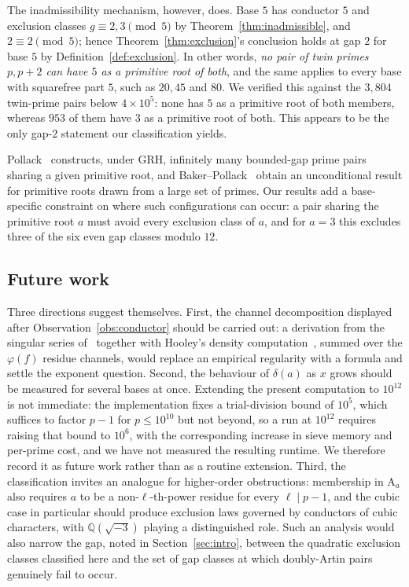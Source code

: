 \documentclass[11pt,reqno]{amsart}
\theoremstyle{plain}
\theoremstyle{definition}
\newcommand{\Art}{\mathrm{A}}
\newcommand{\Q}{\mathbb{Q}}
\begin{document}
The inadmissibility mechanism, however, does. Base $5$ has conductor $5$ and
exclusion classes $g \equiv 2, 3 \pmod 5$ by
Theorem~\ref{thm:inadmissible}, and $2 \equiv 2 \pmod 5$; hence
Theorem~\ref{thm:exclusion}'s conclusion holds at gap $2$ for base $5$ by
Definition~\ref{def:exclusion}. In other words, \emph{no pair of twin primes
$p, p+2$ can have $5$ as a primitive root of both}, and the same applies to
every base with squarefree part $5$, such as $20, 45$ and $80$. We verified
this against the $3{,}804$ twin-prime pairs below $4 \times 10^5$: none has $5$
as a primitive root of both members, whereas $953$ of them have $3$ as a
primitive root of both. This appears to be the only gap-$2$ statement our
classification yields.

Pollack~\cite{Pollack2014} constructs, under GRH, infinitely many bounded-gap
prime pairs sharing a given primitive root, and
Baker--Pollack~\cite{BakerPollack2016} obtain an unconditional result for
primitive roots drawn from a large set of primes. Our results add a
base-specific constraint on where such configurations can occur: a pair
sharing the primitive root $a$ must avoid every exclusion class of $a$, and
for $a = 3$ this excludes three of the six even gap classes modulo $12$.

\subsection*{Future work}
Three directions suggest themselves. First, the channel decomposition displayed
after Observation~\ref{obs:conductor} should be carried out: a derivation from
the singular series of~\cite{HardyLittlewood1923} together with Hooley's
density computation~\cite{Hooley1967}, summed over the $\varphi(f)$ residue
channels, would replace an empirical regularity with a formula and settle the
exponent question. Second, the behaviour of $\delta(a)$ as $x$ grows should be
measured for several bases at once. Extending the present computation to
$10^{12}$ is not immediate: the implementation fixes a trial-division bound of
$10^5$, which suffices to factor $p - 1$ for $p \le 10^{10}$ but not beyond,
so a run at $10^{12}$ requires raising that bound to $10^6$, with the
corresponding increase in sieve memory and per-prime cost, and we have not
measured the resulting runtime. We therefore record it as future work rather
than as a routine extension. Third, the classification invites an analogue for
higher-order obstructions: membership in $\Art_a$ also requires $a$ to be a
non-$\ell$-th-power residue for every $\ell \mid p-1$, and the cubic case in
particular should produce exclusion laws governed by conductors of cubic
characters, with $\Q(\sqrt{-3})$ playing a distinguished role. Such an
analysis would also narrow the gap, noted in Section~\ref{sec:intro}, between
the quadratic exclusion classes classified here and the set of gap classes at
which doubly-Artin pairs genuinely fail to occur.
\end{document}
